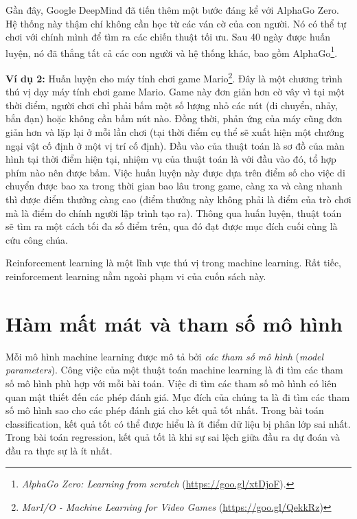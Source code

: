 Gần đây, Google DeepMind đã tiến thêm một bước đáng kể với AlphaGo Zero. Hệ
thống này thậm chí không cần học từ các ván cờ của con người. Nó có thể tự chơi
với chính mình để tìm ra các chiến thuật tối ưu. Sau 40 ngày được huấn
luyện, nó đã thắng tất cả các con người và hệ thống khác, bao gồm
AlphaGo\footnote{\textit{AlphaGo Zero:
Learning from scratch} (\url{https://goo.gl/xtDjoF}).}.

\textbf{Ví dụ 2:} {Huấn luyện cho máy tính chơi game
Mario}\footnote{\textit{MarI/O - Machine Learning for Video Games}
(\url{https://goo.gl/QekkRz})}. Đây là một chương trình thú vị dạy máy tính chơi
game Mario. Game này đơn giản hơn cờ vây vì tại một thời điểm, người chơi chỉ
phải bấm một số lượng nhỏ các nút (di chuyển, nhảy, bắn đạn) hoặc không cần bấm
nút nào. Đồng thời, phản ứng của máy cũng đơn giản hơn và lặp lại ở mỗi lần chơi
(tại thời điểm cụ thể sẽ xuất hiện một chướng ngại vật cố định ở một vị trí cố
định). Đầu vào của thuật toán là sơ đồ của màn hình tại thời điểm hiện tại,
nhiệm vụ của thuật toán là với đầu vào đó, tổ hợp phím nào nên được bấm. Việc
huấn luyện này được dựa trên điểm số cho việc di chuyển được bao xa trong thời
gian bao lâu trong game, càng xa và càng nhanh thì được điểm thưởng càng cao
(điểm thưởng này không phải là điểm của trò chơi mà là điểm do chính người lập
trình tạo ra). Thông qua huấn luyện, thuật toán sẽ tìm ra một cách tối đa số
điểm trên, qua đó đạt được mục đích cuối cùng là cứu công chúa.

Reinforcement learning là một lĩnh vực thú vị trong machine learning. Rất tiếc,
reinforcement learning nằm ngoài phạm vi của cuốn sách này.

\section{Hàm mất mát và tham số mô hình}
Mỗi mô hình machine learning được mô tả bởi \textit{các tham số mô hình}
(\textit{model parameters}). Công việc của một thuật toán machine learning là đi
tìm các tham số mô hình phù hợp với mỗi bài toán. Việc đi tìm các tham số mô
hình có liên quan mật thiết đến các phép đánh giá. Mục đích của chúng ta là đi
tìm các tham số mô hình sao cho các phép đánh giá cho kết quả tốt nhất. Trong
bài toán classification, kết quả tốt có thể được hiểu là ít điểm dữ liệu bị phân
lớp sai nhất. Trong bài toán regression, kết quả tốt là khi sự sai lệch giữa đầu
ra dự đoán và đầu ra thực sự là ít nhất.

